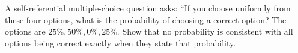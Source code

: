 A self-referential multiple-choice question asks: ``If you choose uniformly from these four options, what is the probability of choosing a correct option? The options are $25\%,50\%,0\%,25\%$. Show that no probability is consistent with all options being correct exactly when they state that probability.
